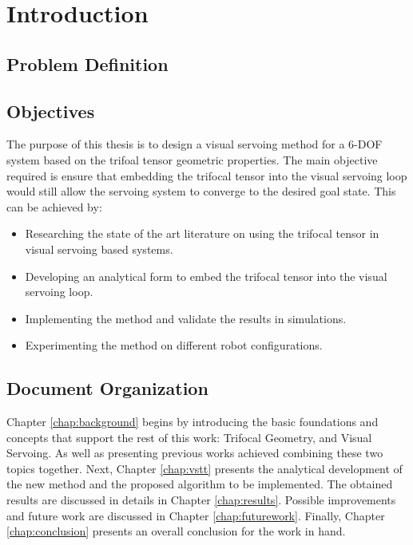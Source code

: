 \chapter{Introduction} \label{chap:intro}



\section{Problem Definition} \label{sec:problemdefinition}


\section{Objectives}
The purpose of this thesis is to design a visual servoing method for a 6-DOF system based on the trifoal tensor geometric properties. The main objective required is ensure that embedding the trifocal tensor into the visual servoing loop would still allow the servoing system to converge to the desired goal state. This can be achieved by:
\begin{itemize}
  \item Researching the state of the art literature on using the trifocal tensor in visual servoing based systems.
  \item Developing an analytical form to embed the trifocal tensor into the visual servoing loop.
  \item Implementing the method and validate the results in simulations.
  \item Experimenting the method on different robot configurations.
\end{itemize}

\section{Document Organization}
Chapter \ref{chap:background} begins by introducing the basic foundations and concepts that support the rest of this work: Trifocal Geometry, and Visual Servoing. As well as presenting previous works achieved combining these two topics together.
Next, Chapter \ref{chap:vstt} presents the analytical development of the new method and the proposed algorithm to be implemented.
The obtained results are discussed in details in Chapter \ref{chap:results}. Possible improvements and future work are discussed in Chapter \ref{chap:futurework}. Finally, Chapter \ref{chap:conclusion} presents an overall conclusion for the work in hand.
